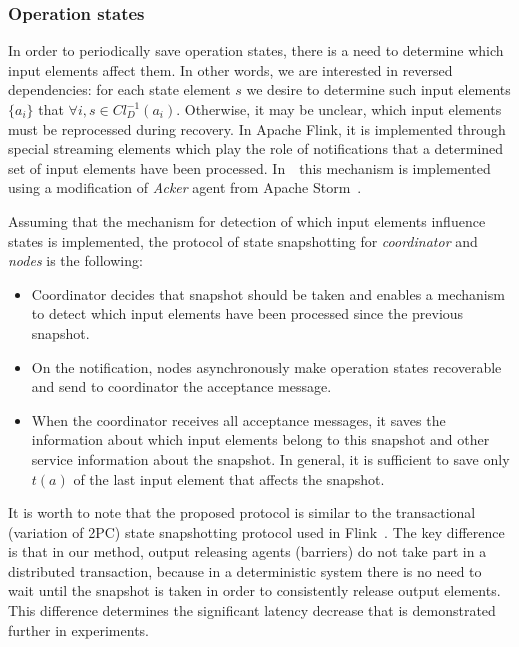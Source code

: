 \subsubsection{Operation states}

In order to periodically save operation states, there is a need to determine which input elements affect them. In other words, we are interested in reversed dependencies: for each state element $s$ we desire to determine such input elements $\{a_i\}$ that $\forall i, s \in Cl_D^{-1}(a_i)$. Otherwise, it may be unclear, which input elements must be reprocessed during recovery. In Apache Flink, it is implemented through special streaming elements which play the role of notifications that a determined set of input elements have been processed. In~\FlameStream\ this mechanism is implemented using a modification of {\em Acker} agent from Apache Storm~\cite{apache:storm}. 

Assuming that the mechanism for detection of which input elements influence states is implemented, the protocol of state snapshotting for {\em coordinator} and {\em nodes} is the following:

\begin{itemize}
    \item Coordinator decides that snapshot should be taken and enables a mechanism to detect which input elements have been processed since the previous snapshot.
    \item On the notification, nodes asynchronously make operation states recoverable and send to coordinator the acceptance message.
    \item When the coordinator receives all acceptance messages, it saves the information about which input elements belong to this snapshot and other service information about the snapshot. In general, it is sufficient to save only $t(a)$ of the last input element that affects the snapshot.
\end{itemize}

It is worth to note that the proposed protocol is similar to the transactional (variation of 2PC) state snapshotting protocol used in Flink~\cite{Carbone:2017:SMA:3137765.3137777}. The key difference is that in our method, output releasing agents (barriers) do not take part in a distributed transaction, because in a deterministic system there is no need to wait until the snapshot is taken in order to consistently release output elements. This difference determines the significant latency decrease that is demonstrated further in experiments.

